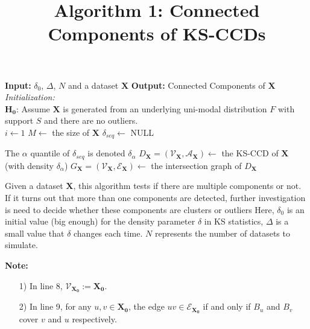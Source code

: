 \documentclass[a4paper]{article}
\title{Algorithm 1: Connected Components of KS-CCDs}
\date{}
\renewcommand{\KwData}{\textbf{Input: }}
\renewcommand{\KwResult}{\textbf{Output: }}
\begin{document}
\maketitle
\begin{algorithm}

\KwData{$\delta_0$, $\Delta$, $N$ and a dataset $\mathbf{X}$}\;
\KwResult{Connected Components of $\mathbf{X}$}\;
\vspace{10pt}
\textit{Initialization:}\\
\nl$\mathbf{H_0}$: Assume $\mathbf{X}$ is generated from an underlying uni-modal distribution $F$     with support $S$ and there are no outliers.\\
\nl$i \gets 1$\;
\nl$M \gets$ the size of $\mathbf{X}$\;
\nl$\delta_{seq} \gets$ NULL 

\nl{}
\nl The $\alpha$ quantile of $\delta_{seq}$ is denoted $\delta_{\alpha}$\;
\nl $D_{\mathbf{X}}=(\mathcal{V}_{\mathbf{X}},\mathcal{A}_{\mathbf{X}}) \gets$ the KS-CCD of $\mathbf{X}$ (with density $\delta_{\alpha}$)\;
\nl	$G_{\mathbf{X}}=(\mathcal{V}_{\mathbf{X}},\mathcal{E}_{\mathbf{X}})\gets$ the intersection graph of $D_{\mathbf{X}}$\;
\vspace{10pt}
\nl{}
\caption{Given a dataset $\mathbf{X}$, this algorithm tests if there are multiple components or not. If it turns out that more than one components are detected, further investigation is need to decide whether these components are clusters or outliers\;
Here, $\delta_0$ is an initial value (big enough) for the density parameter $\delta$ in KS statistics, $\Delta$ is a small value that $\delta$ changes each time. $N$ represents the number of datasets to simulate.}
\end{algorithm}
\noindent
\textbf{Note:} \begin{itemize}
	\item[1)] In line 8, $\mathcal{V}_{\mathbf{X_0}}:=\mathbf{X_0}$.
	\item[2)] In line 9, for any $u,v \in \mathbf{X_0}$, the edge $uv \in \mathcal{E}_{\mathbf{X_0}}$ if and only if $B_u$ and $B_v$ cover $v$ and $u$ respectively.
\end{itemize}
\end{document}
